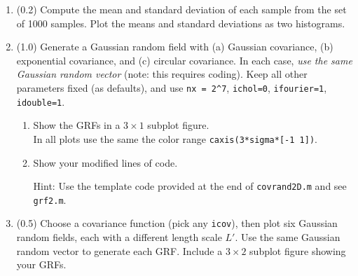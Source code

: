 \documentclass[11pt,titlepage,fleqn]{article}
\begin{document}
\begin{enumerate}
\item (0.2) Compute the mean and standard deviation of each sample from the set of 1000 samples. Plot the means and standard deviations as two histograms.

\item (1.0) Generate a Gaussian random field with (a) Gaussian covariance, (b) exponential covariance, and (c) circular covariance. In each case, {\em use the same Gaussian random vector} (note: this requires coding). Keep all other parameters fixed (as defaults), and use \verb+nx = 2^7+, \verb+ichol=0+, \verb+ifourier=1+, \verb+idouble=1+. 
%
\begin{enumerate}
\item Show the GRFs in a $3 \times 1$ subplot figure. \\
In all plots use the same the color range \verb+caxis(3*sigma*[-1 1])+.

\item Show your modified lines of code.

Hint: Use the template code provided at the end of \verb+covrand2D.m+ and see \verb+grf2.m+.
\end{enumerate}

\item (0.5) Choose a covariance function (pick any \verb+icov+), then plot six Gaussian random fields, each with a different length scale $L'$. Use the same Gaussian random vector to generate each GRF. Include a $3 \times 2$ subplot figure showing your GRFs.

\end{enumerate}








\end{document}
